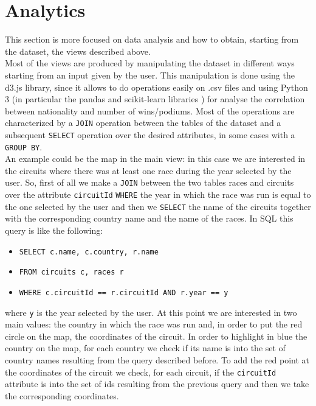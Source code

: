 \documentclass[11pt,twocolumn,letterpaper]{article}
\begin{document}
\section{Analytics}
This section is more focused on data analysis and how to obtain, starting from the dataset, the views described above.\\
Most of the views are produced by manipulating the dataset in different ways starting from an input given by the user. This manipulation is done using the d3.js \cite{D3} library,
since it allows to do operations easily on .csv files and using Python 3 (in particular the pandas \cite{Pandas} and scikit-learn libraries \cite{Scikit-learn}) 
for analyse the correlation between nationality and number of wins/podiums. Most of the operations are characterized by a \texttt{JOIN} operation between the tables of the 
dataset and a subsequent \texttt{SELECT} operation over the desired attributes, in some cases with a \texttt{GROUP BY}.\\
An example could be the map in the main view: in this case we are interested in the circuits where there was at least one race during the year selected by the user. So, first
of all we make a \texttt{JOIN} between the two tables races and circuits over the attribute \texttt{circuitId} \texttt{WHERE} the year in which the race was run is equal to the
one selected by the user and then we \texttt{SELECT} the name of the circuits together with the corresponding country name and the name of the races. In SQL this query is like the
following:
\begin{itemize}
	\item \texttt{SELECT c.name, c.country, r.name}
	\item \texttt{FROM circuits c, races r}
	\item \texttt{WHERE c.circuitId == r.circuitId AND r.year == y}
\end{itemize}
where \texttt{y} is the year selected by the user.
At this point we are interested in two main values: the country in which the race was run and, in order to put the red circle on the map, the coordinates of the circuit. In order to
highlight in blue the country on the map, for each country we check if its name is into the set of country names resulting from the query described before. To add the red point
at the coordinates of the circuit we check, for each circuit, if the \texttt{circuitId} attribute is into the set of ids resulting from the previous query and then we take the
corresponding coordinates.\\
\end{document}
